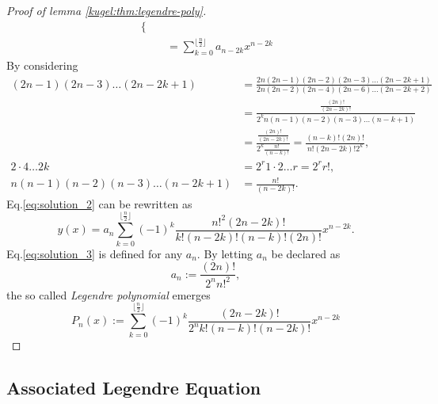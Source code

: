 \begin{proof}[Proof of lemma \ref{kugel:thm:legendre-poly}]
\begin{align}
\begin{cases}
    \end{cases} \nonumber \\
    &= \sum_{k=0}^{\lfloor \frac{n}{2} \rfloor} a_{n-2k}x^{n-2k} \label{eq:solution_2}
  \end{align}
  By considering
  \begin{align}
    (2n-1)(2n-3)\hdots (2n-2k+1)&=\frac{2n(2n-1)(2n-2)(2n-3)\hdots(2n-2k+1)}
    {2n(2n-2)(2n-4)(2n-6)\hdots(2n-2k+2)} \nonumber \\ 
    &=\frac{\frac{(2n)!}{(2n-2k)!}}
    {2^kn(n-1)(n-2)(n-3)\hdots(n-k+1)} \nonumber \\
    &=\frac{\frac{(2n)!}{(2n-2k)!}}
    {2^k\frac{n!}{(n-k)!}}=\frac{(n-k)!(2n)!}{n!(2n-2k)!2^k} \label{eq:1_sub_recursion}, \\
    2 \cdot 4  \hdots 2k &= 2^r 1\cdot2 \hdots r = 2^r r!\label{eq:2_sub_recursion}, \\
    n(n-1)(n-2)(n-3) \hdots (n-2k+1) &= \frac{n!}{(n-2k)!}\label{eq:3_sub_recursion}.
  \end{align}
  Eq.\eqref{eq:solution_2} can be rewritten as
  \begin{equation}\label{eq:solution_3}
    y(x)=a_n \sum_{k=0}^{\lfloor \frac{n}{2} \rfloor} (-1)^k \frac{n!^2(2n-2k)!}{k!(n-2k)!(n-k)!(2n)!}  x^{n-2k}.
  \end{equation}
  Eq.\eqref{eq:solution_3} is defined for any $a_n$. By letting $a_n$ be declared as
  \begin{equation*}
    a_{n} := \frac{(2n)!}{2^n n!^2},
  \end{equation*}
  the so called \emph{Legendre polynomial} emerges
  \begin{equation}\label{eq:leg_poly}
    P_n(x):=\sum_{k=0}^{\lfloor \frac{n}{2} \rfloor} (-1)^k \frac{(2n-2k)!}{2^n k! (n-k)!(n-2k)!} x^{n-2k} 
  \end{equation}
\end{proof}

\subsection{Associated Legendre Equation}
\label{kugel:sec:proofs:associated-legendre}

